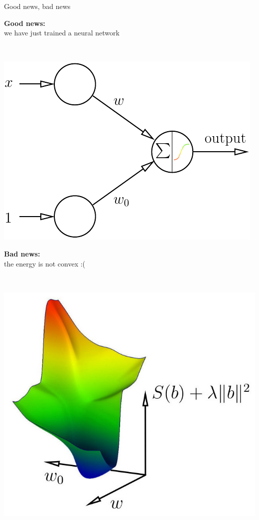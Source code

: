 \documentclass[UKenglish,aspectratio=169]{beamer}
\begin{document}
\begin{frame}{Good news, bad news}
\begin{minipage}[t]{.45\linewidth}
\strut\vspace*{-\baselineskip}\newline
\textbf{Good news:}\\ we have just trained a neural network

~\\

\centerline{\includegraphics[width=.9\linewidth]{../manuscript/img/neuron.pdf}}
\end{minipage}
\pause
\qquad
\begin{minipage}[t]{.45\linewidth}
\strut\vspace*{-\baselineskip}\newline
\textbf{Bad news:}\\ the energy is not convex :(

~\\
\centerline{\includegraphics[width=.9\linewidth]{../manuscript/img/ls-classification-energy.jpg}}
\end{minipage}
\end{frame}
\end{document}
